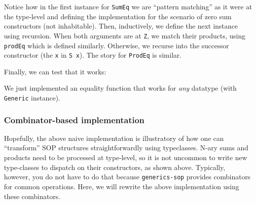 \begin{Shaded}
\begin{Highlighting}[]
\NormalTok{ (}\OtherTok{=\textgreater{}} \OperatorTok{:}
\OperatorTok{:*}\OperatorTok{:*}\OtherTok{=}\OperatorTok{==}\OperatorTok{\&\&}
\end{Highlighting}
\end{Shaded}

Notice how in the first instance for \texttt{SumEq} we are ``pattern
matching'' as it were at the type-level and defining the implementation
for the scenario of zero sum constructors (not inhabitable). Then,
inductively, we define the next instance using recursion. When both
arguments are at \texttt{Z}, we match their products, using
\texttt{prodEq} which is defined similarly. Otherwise, we recurse into
the successor constructor (the \texttt{x} in \texttt{S\ x}). The story
for \texttt{ProdEq} is similar.

Finally, we can test that it works:

\begin{Shaded}
\begin{Highlighting}[]
\OperatorTok{\textgreater{}} \NormalTok{) (} \NormalTok{)}
\OperatorTok{\textgreater{}}  \NormalTok{) (}  \OtherTok{ ::}   \NormalTok{)}
\end{Highlighting}
\end{Shaded}

We just implemented an equality function that works for \emph{any}
datatype (with \texttt{Generic} instance).

\hypertarget{combinator-based-implementation}{%
\subsubsection{Combinator-based
implementation}\label{combinator-based-implementation}}

Hopefully, the above naive implementation is illustratory of how one can
``transform'' SOP structures straightforwardly using typeclasses. N-ary
sums and products need to be processed at type-level, so it is not
uncommon to write new type-classes to dispatch on their constructors, as
shown above. Typically, however, you do not have to do that because
\texttt{generics-sop} provides combinators for common operations. Here,
we will rewrite the above implementation using these combinators.

